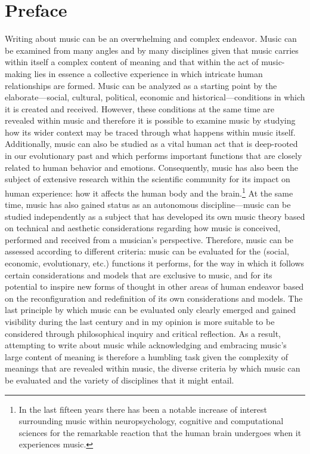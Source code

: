 \chapter{Preface}


Writing about music can be an overwhelming and complex endeavor. Music can be examined from many angles and by many disciplines given that music carries within itself a complex content of meaning and that within the act of music-making lies in essence a collective experience in which intricate human relationships are formed. Music can be analyzed as a starting point by the elaborate---social, cultural, political, economic and historical---conditions in which it is created and received. However, these conditions at the same time are revealed within music and therefore it is possible to examine music by studying how its wider context may be traced through what happens within music itself. Additionally, music can also be studied as a vital human act that is deep-rooted in our evolutionary past and which performs important functions that are closely related to human behavior and emotions. Consequently, music has also been the subject of extensive research within the scientific community for its impact on human experience: how it affects the human body and the brain.\footnote{In the last fifteen years there has been a notable increase of interest surrounding music within neuropsychology, cognitive and computational sciences for the remarkable reaction that the human brain undergoes when it experiences music.} At the same time, music has also gained status as an autonomous discipline---music can be studied independently as a subject that has developed its own music theory based on technical and aesthetic considerations regarding how music is conceived, performed and received from a musician's perspective. Therefore, music can be assessed according to different criteria: music can be evaluated for the (social, economic, evolutionary, etc.) functions it performs, for the way in which it follows certain considerations and models that are exclusive to music, and for its potential to inspire new forms of thought in other areas of human endeavor based on the reconfiguration and redefinition of its own considerations and models. The last principle by which music can be evaluated only clearly emerged and gained visibility during the last century and in my opinion is more suitable to be considered through philosophical inquiry and critical reflection. As a result, attempting to write about music while acknowledging and embracing music's large content of meaning is therefore a humbling task given the complexity of meanings that are revealed within music, the diverse criteria by which music can be evaluated and the variety of disciplines that it might entail.

